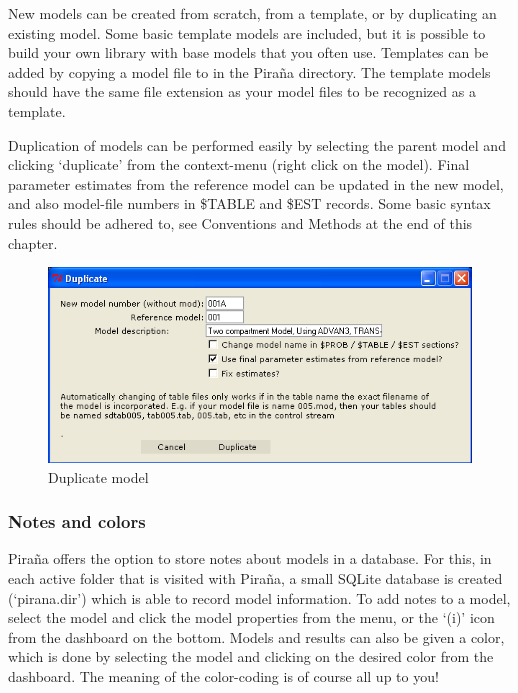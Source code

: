 \documentclass[a4,11pt]{report} \usepackage[pdftex]{graphicx}
\begin{document}
New models can be created from scratch, from a template, or by duplicating
an existing model. Some basic template models are included, but it is
possible to build your own library with base models that you often
use. Templates can be added by copying a model file to
\normalfont in the Pira\~na directory. The
template models should have the same file extension as your model
files to be recognized as a template.

Duplication of models can be performed easily by selecting the parent
model and clicking `duplicate' from the context-menu (right click on the model).
Final parameter estimates from the reference model can be updated in the new model,
and also model-file numbers in \$TABLE and \$EST records. Some basic
syntax rules should be adhered to, see Conventions and Methods at the
end of this chapter.

\begin{figure}[hbt] \centering
    \includegraphics[scale=0.4]{images/duplicate.png}
    \caption{Duplicate model}
\end{figure}

\subsubsection*{Notes and colors}
Pira\~na offers the option to store notes about models in a
database. For this, in each active folder that is visited with
Pira\~na, a small SQLite database is created (`pirana.dir') which is
able to record model information. To add notes to a model, select the
model and click the model properties from the menu, or the `(i)' icon
from the dashboard on the bottom. Models and results can also be given
a color, which is done by selecting the model and clicking on the
desired color from the dashboard. The meaning of the color-coding is
of course all up to you!
\end{document}
